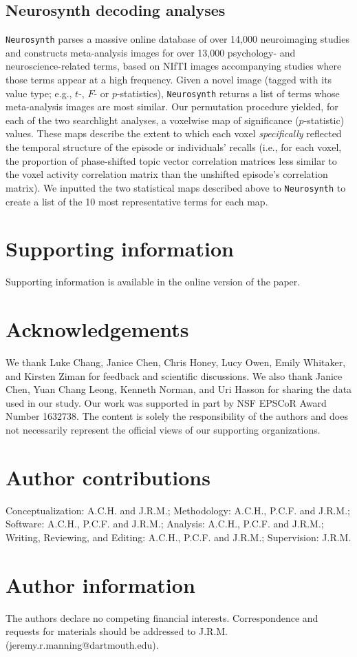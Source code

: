 \documentclass{article}
\begin{document}
\subsection*{Neurosynth decoding analyses}
\texttt{Neurosynth} parses a massive online database of over 14,000 neuroimaging studies and constructs meta-analysis images for over 13,000 psychology- and neuroscience-related terms, based on NIfTI images accompanying studies where those terms appear at a high frequency.  Given a novel image (tagged with its value type; e.g., $t$-, $F$- or $p$-statistics), \texttt{Neurosynth} returns a list of terms whose meta-analysis images are most similar.  Our permutation procedure yielded, for each of the two searchlight analyses, a voxelwise map of significance ($p$-statistic) values.  These maps describe the extent to which each voxel \textit{specifically} reflected the temporal structure of the episode or individuals' recalls (i.e., for each voxel, the proportion of phase-shifted topic vector correlation matrices less similar to the voxel activity correlation matrix than the unshifted episode's correlation matrix). We inputted the two statistical maps described above to \texttt{Neurosynth} to create a list of the 10 most representative terms for each map.


% 


\section*{Supporting information}
Supporting information is available in the online version of the paper.

\section*{Acknowledgements}
We thank Luke Chang, Janice Chen, Chris Honey, Lucy Owen, Emily Whitaker, and Kirsten Ziman for feedback and scientific discussions. We also thank Janice Chen, Yuan Chang Leong, Kenneth Norman, and Uri Hasson for sharing the data used in our study.  Our work was supported in part by NSF EPSCoR Award Number 1632738. The content is solely the responsibility of the authors and does not necessarily represent the official views of our supporting organizations.

\section*{Author contributions}
Conceptualization: A.C.H. and J.R.M.; Methodology: A.C.H., P.C.F. and J.R.M.; Software: A.C.H., P.C.F. and J.R.M.; Analysis: A.C.H., P.C.F. and J.R.M.; Writing, Reviewing, and Editing: A.C.H., P.C.F. and J.R.M.; Supervision: J.R.M.

\section*{Author information}
The authors declare no competing financial interests.  Correspondence and requests for materials should be addressed to J.R.M. (jeremy.r.manning@dartmouth.edu).
\end{document}
